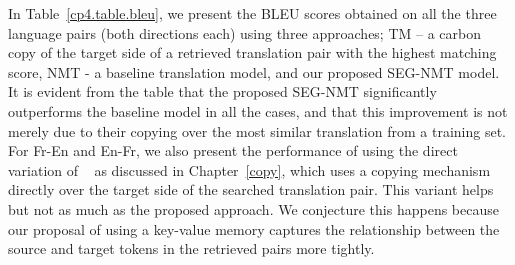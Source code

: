 In Table~\ref{cp4.table.bleu}, we present the BLEU scores obtained on all the three language pairs (both directions each) using three approaches; TM -- a carbon copy of the target side of a retrieved translation pair with the highest matching score, NMT - a baseline translation model, and our proposed SEG-NMT model. It is evident from the table that the proposed SEG-NMT significantly outperforms the baseline model in all the cases, and that this improvement is not merely due to their copying over the most similar translation from a training set. For Fr-En and En-Fr, we also present the performance of using the direct variation of \copynet~\citep{gu2016incorporating} as discussed in Chapter~\ref{copy}, which uses a copying mechanism directly over the target side of the searched translation pair. This \copynet variant helps but not as much as the proposed approach. We conjecture this happens because our proposal of using a key-value memory captures the relationship between the source and target tokens in the retrieved pairs more tightly.


